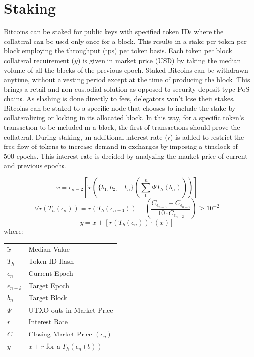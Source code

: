 \documentclass[a4paper,10pt]{article}
\makeatletter
\newenvironment{conditions}
  {\par\vspace{\abovedisplayskip}\noindent\begin{tabular}{>{$}l<{$} @{${}={}$} l}}
  {\end{tabular}\par\vspace{\belowdisplayskip}}
\makeatother
\begin{document}
\section{Staking}
Bitcoins can be staked for public keys with specified token IDs where the collateral can be used only once for a block. This results in a stake per token per block employing the throughput (tps) per token basis. Each token per block collateral requirement ($y$) is given in market price (USD) by taking the median volume of all the blocks of the previous epoch. Staked Bitcoins can be withdrawn anytime, without a vesting period except at the time of producing the block. This brings a retail and non-custodial solution as opposed to security deposit-type PoS chains. As slashing is done directly to fees, delegators won't lose their stakes. Bitcoins can be staked to a specific node that chooses to include the stake by collateralizing or locking in its allocated block. In this way, for a specific token's transaction to be included in a block, the first of transactions should prove the collateral. During staking, an additional interest rate ($r$) is added to restrict the free flow of tokens to increase demand in exchanges by imposing a timelock of 500 epochs. This interest rate is decided by analyzing the market price of current and previous epochs.

\begin{equation}
x=\epsilon_{n-2}[\widetilde{x}( \{b_1, b_2, \dots b_n\} (\sum_0^n \Psi T_h(b_n)))]
\end{equation}
\begin{equation}
\forall r (T_h(\epsilon_n)) =  r(T_h(\epsilon_{n-1}))  +  (\frac{C_{\epsilon_{n-3}} - C_{\epsilon_{n-2}}}{10  \cdot  C_{\epsilon_{n-2}}}) \geq 10^{-2}
\end{equation}
\begin{equation}
y=x+ [r (T_h(\epsilon_n)) \cdot (x)]
\end{equation}
where:
\begin{conditions}
\widetilde{x} & Median Value\\
T_h & Token ID Hash\\
\epsilon_n & Current Epoch\\
\epsilon_{n-k} & Target Epoch\\
b_n & Target Block\\
\Psi & UTXO outs in Market Price\\
r & Interest Rate\\
C & Closing Market Price $(\epsilon_n)$\\
y & $x+r$ for a $T_h(\epsilon_{n}(b))$
\end{conditions}
\end{document}

